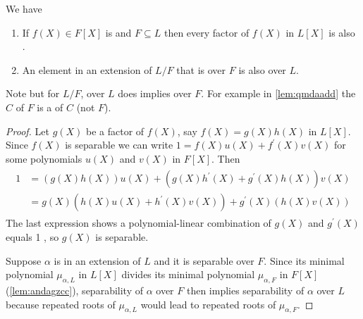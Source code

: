 \documentclass{article}
\begin{document}
\begin{cora}\label{cor:indqeed}We have
\begin{enumerate}
    \item If $f(X) \in F[X]$ is  and $F\subseteq L$ then every factor of $f(X)$ in $L[X]$ is also .
    \item  An element in an extension of $L/F$ that is  over $F$ is also  over $L$. 
\end{enumerate}
\begin{remx}
Note but for $L/F$,   over $L$ does   implies  over $F$. For example in \cref{lem:qmdaadd} the   $C$ of $F$ is a  of $C$ (not $F$).
\end{remx}
\end{cora}
\begin{proof}
Let $g(X)$ be a factor of $f(X)$, say $f(X)=g(X) h(X)$ in $L[X]$. Since $f(X)$ is separable we can write $1=f(X) u(X)+f^{\prime}(X) v(X)$ for some polynomials $u(X)$ and $v(X)$ in $F[X]$. Then
\begin{align*}
\begin{aligned}
1 &=(g(X) h(X)) u(X)+\left(g(X) h^{\prime}(X)+g^{\prime}(X) h(X)\right) v(X) \\
&=g(X)\left(h(X) u(X)+h^{\prime}(X) v(X)\right)+g^{\prime}(X)(h(X) v(X))
\end{aligned}
\end{align*}
The last expression shows a polynomial-linear combination of $g(X)$ and $g^{\prime}(X)$ equals 1 , so $g(X)$ is separable.

Suppose $\alpha$ is in an extension of $L$ and it is separable over $F$. Since its minimal polynomial $\mu_{\alpha,L}$ in  $L[X]$ divides its minimal polynomial $\mu_{\alpha,F}$ in $F[X]$ (\cref{lem:andagzcc}), separability of $\alpha$ over $F$ then implies separability of $\alpha$ over $L$ because repeated roots of $\mu_{\alpha,L}$ would lead to repeated roots of $\mu_{\alpha,F}$.
\end{proof}
\end{document}
